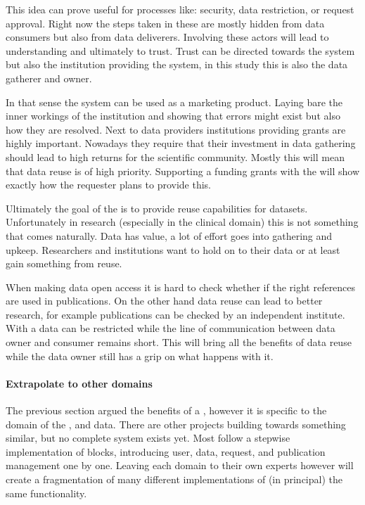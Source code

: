 This idea can prove useful for processes like: security, data restriction, or request approval.
Right now the steps taken in these are mostly hidden from data consumers but also from data deliverers.
Involving these actors will lead to understanding and ultimately to trust.
Trust can be directed towards the system but also the institution providing the system, in this study this is also the data gatherer and owner.

In that sense the system can be used as a marketing product.
Laying bare the inner workings of the institution and showing that errors might exist but also how they are resolved.
Next to data providers institutions providing grants are highly important.
Nowadays they require that their investment in data gathering should lead to high returns for the scientific community.
Mostly this will mean that data reuse is of high priority. 
Supporting a funding grants with the \ivfsystem{} will show exactly how the requester plans to provide this.

Ultimately the goal of the \ivfsystem{} is to provide reuse capabilities for datasets.
Unfortunately in research (especially in the clinical domain) this is not something that comes naturally.
Data has value, a lot of effort goes into gathering and upkeep.
Researchers and institutions want to hold on to their data or at least gain something from reuse.

When making data open access it is hard to check whether if the right references are used in publications.
On the other hand data reuse can lead to better research, for example publications can be checked by an independent institute.
With a \ivfsystem{} data can be restricted while the line of communication between data owner and consumer remains short.
This will bring all the benefits of data reuse while the data owner still has a grip on what happens with it.

\paragraph{Extrapolate to other domains}

The previous section argued the benefits of a \ivfsystem{}, however it is specific to the domain of the \projectdata{}, \ie{} \IVF{} and \PRN{} data.
There are other projects building towards something similar, but no complete system exists yet.
Most follow a stepwise implementation of blocks, introducing user, data, request, and publication management one by one.
Leaving each domain to their own experts however will create a fragmentation of many different implementations of (in principal) the same functionality.

